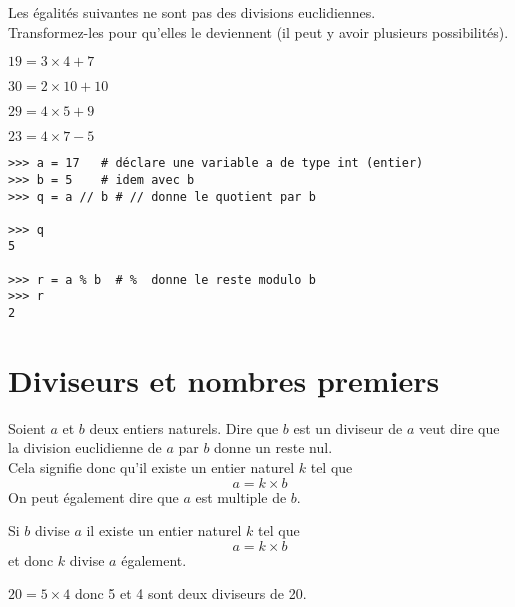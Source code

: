 \begin{exercice}[]
	
	Les égalités suivantes ne sont pas des divisions euclidiennes.\\
	Transformez-les pour qu'elles le deviennent (il peut y avoir plusieurs possibilités).
	
	\begin{multicols}{2}
		\begin{enumalph}
			\item 	$19=3\times 4 + 7$
			\item 	$30=2\times 10 + 10$
			\item 	$29 = 4\times 5 +9$
			\item 	$23=  4\times 7 -5$\\
		\end{enumalph}
	\end{multicols}
\end{exercice}



\begin{pyc}
	\begin{verbatim}
>>> a = 17   # déclare une variable a de type int (entier)
>>> b = 5    # idem avec b
>>> q = a // b # // donne le quotient par b

>>> q
5

>>> r = a % b  # %  donne le reste modulo b
>>> r
2	
\end{verbatim}
\end{pyc}

\section{Diviseurs et nombres premiers}

\begin{propriete}
	Soient $a$ et $b$ deux entiers naturels. Dire que $b$ est un diviseur de $a$ veut dire que la division euclidienne de $a$ par $b$ donne un reste nul.\\
	Cela signifie donc qu'il existe un entier naturel $k$ tel que $$a=k\times b$$
	On peut également dire que $a$ est multiple de $b$.
\end{propriete}

\begin{remarque}
	Si $b$ divise $a$ il existe un entier naturel $k$ tel que $$a=k\times b$$ et donc $k$ divise $a$ également.
\end{remarque}

\begin{exemple}[]
	$20=5\times 4$ donc 5 et 4 sont deux diviseurs de 20.
\end{exemple}

